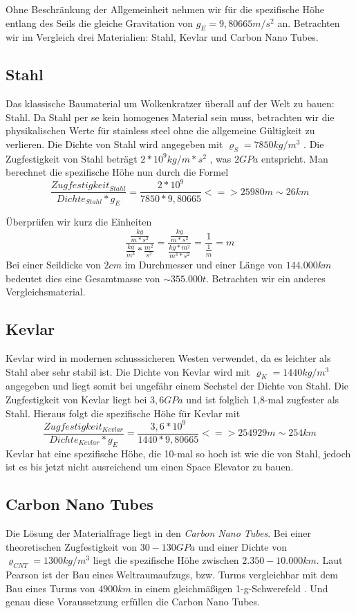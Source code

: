 \documentclass[a4paper, 10pt]{report}
\begin{document}
Ohne Beschränkung der Allgemeinheit nehmen wir für die spezifische Höhe entlang des Seils die gleiche Gravitation von $g_E = 9,80665 m/s^2$ an.
Betrachten wir im Vergleich drei Materialien: Stahl, Kevlar und Carbon Nano Tubes. \cite[vergleiche]{ED00}
\subsection{Stahl}
Das klassische Baumaterial um Wolkenkratzer überall auf der Welt zu bauen: Stahl. Da Stahl per se kein homogenes Material sein muss, betrachten wir die physikalischen Werte für stainless steel ohne die allgemeine Gültigkeit zu verlieren. Die Dichte von Stahl wird angegeben mit $\varrho_S = 7850 kg/m^3$ \cite[Vgl.]{PE75}. Die Zugfestigkeit von Stahl beträgt $2*10^9 kg/m*s^2$ , was $2GPa$ entspricht. Man berechnet die spezifische Höhe nun durch die Formel 
\begin{equation}
\frac{Zugfestigkeit_{Stahl}}{Dichte_{Stahl}*g_E} = \frac{2*10^9}{7850*9,80665}
<=> 25 980 m \sim 26 km 
\end{equation}

Überprüfen wir kurz die Einheiten
\begin{equation}
\frac{\frac{kg}{m*s^2}}{\frac{kg}{m^3}*\frac{m^2}{s^2}}= \frac{\frac{kg}{m*s^2}}{\frac{kg*m^2}{m^3*s^2}} = \frac{1}{\frac{1}{m}} = m
\end{equation}
Bei einer Seildicke von $2 cm$ im Durchmesser und einer Länge von $144.000 km$ bedeutet dies eine Gesamtmasse von $\sim 355.000 t$.\cite{PE75}
Betrachten wir ein anderes Vergleichsmaterial.
\subsection{Kevlar}
Kevlar wird in modernen schusssicheren Westen verwendet, da es leichter als Stahl aber sehr stabil ist. Die Dichte von Kevlar wird mit $\varrho_K = 1440 kg/m^3$ angegeben und liegt somit bei ungefähr einem Sechstel der Dichte von Stahl. Die Zugfestigkeit von Kevlar liegt bei $3,6 GPa$ und ist folglich 1,8-mal zugfester als Stahl. Hieraus folgt die spezifische Höhe für Kevlar mit
\begin{equation}
\frac{Zugfestigkeit_{Kevlar}}{Dichte_{Kevlar}*g_E} = \frac{3,6*10^9}{1440*9,80665}
<=> 254 929 m \sim 254 km 
\end{equation}
Kevlar hat eine spezifische Höhe, die 10-mal so hoch ist wie die von Stahl, jedoch ist es bis jetzt nicht ausreichend um einen Space Elevator zu bauen. \cite{PE75}
\subsection{Carbon Nano Tubes}
\label{sec:cnt}
Die Lösung der Materialfrage liegt in den \textsl{Carbon Nano Tubes}.
Bei einer theoretischen Zugfestigkeit von $30 - 130 GPa$ und einer Dichte von $\varrho_{CNT} = 1300 kg/m^3$ liegt die spezifische Höhe zwischen $2.350 - 10.000 km$. Laut Pearson ist der Bau eines Weltraumaufzugs, bzw. Turms vergleichbar mit dem Bau eines Turms von $4900 km$ in einem gleichmäßigen 1-g-Schwerefeld \cite{PE75}. Und genau diese Voraussetzung erfüllen die Carbon Nano Tubes.
\end{document}
